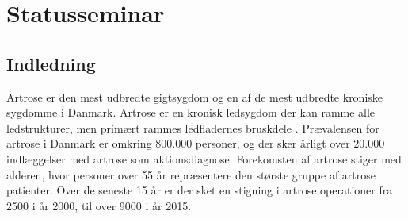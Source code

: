 
\raggedbottom



 \clearpage


\chapter{Statusseminar}\vspace{-0.75cm}
\section{Indledning}
Artrose er den mest udbredte gigtsygdom og en af de mest udbredte kroniske sygdomme i Danmark. 
Artrose er en kronisk ledsygdom der kan ramme alle ledstrukturer, men primært rammes ledfladernes bruskdele \citep{schroder}. Prævalensen for artrose i Danmark er omkring 800.000 personer, og der sker årligt over 20.000 indlæggelser med artrose som aktionsdiagnose. \citep{sygdom}
Forekomsten af artrose stiger med alderen, hvor personer over 55 år repræsentere den største gruppe af artrose patienter. Over de seneste 15 år er der sket en stigning i artrose operationer fra 2500 i år 2000, til over 9000 i år 2015. \citep{aarsrapport2016} \\

